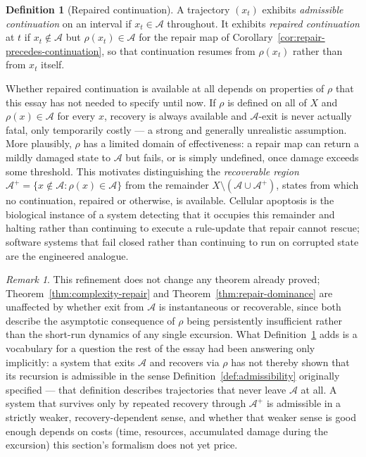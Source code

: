 \documentclass[11pt,a4paper]{article}
\theoremstyle{plain}
\theoremstyle{definition}
\newtheorem{definition}[theorem]{Definition}
\theoremstyle{remark}
\newtheorem{remark}[theorem]{Remark}
\newcommand{\Adm}{\mathcal{A}}
\begin{document}
\begin{definition}[Repaired continuation]
\label{def:repaired-continuation}
A trajectory $(x_t)$ exhibits \emph{admissible continuation} on an interval if $x_t \in \Adm$ throughout. It exhibits \emph{repaired continuation} at $t$ if $x_t \notin \Adm$ but $\rho(x_t) \in \Adm$ for the repair map of Corollary~\ref{cor:repair-precedes-continuation}, so that continuation resumes from $\rho(x_t)$ rather than from $x_t$ itself.
\end{definition}

Whether repaired continuation is available at all depends on properties of $\rho$ that this essay has not needed to specify until now. If $\rho$ is defined on all of $X$ and $\rho(x) \in \Adm$ for every $x$, recovery is always available and $\Adm$-exit is never actually fatal, only temporarily costly — a strong and generally unrealistic assumption. More plausibly, $\rho$ has a limited domain of effectiveness: a repair map can return a mildly damaged state to $\Adm$ but fails, or is simply undefined, once damage exceeds some threshold. This motivates distinguishing the \emph{recoverable region} $\Adm^{+} = \{x \notin \Adm : \rho(x) \in \Adm\}$ from the remainder $X \setminus (\Adm \cup \Adm^{+})$, states from which no continuation, repaired or otherwise, is available. Cellular apoptosis is the biological instance of a system detecting that it occupies this remainder and halting rather than continuing to execute a rule-update that repair cannot rescue; software systems that fail closed rather than continuing to run on corrupted state are the engineered analogue.

\begin{remark}
This refinement does not change any theorem already proved; Theorem~\ref{thm:complexity-repair} and Theorem~\ref{thm:repair-dominance} are unaffected by whether exit from $\Adm$ is instantaneous or recoverable, since both describe the asymptotic consequence of $\rho$ being persistently insufficient rather than the short-run dynamics of any single excursion. What Definition~\ref{def:repaired-continuation} adds is a vocabulary for a question the rest of the essay had been answering only implicitly: a system that exits $\Adm$ and recovers via $\rho$ has not thereby shown that its recursion is admissible in the sense Definition~\ref{def:admissibility} originally specified — that definition describes trajectories that never leave $\Adm$ at all. A system that survives only by repeated recovery through $\Adm^{+}$ is admissible in a strictly weaker, recovery-dependent sense, and whether that weaker sense is good enough depends on costs (time, resources, accumulated damage during the excursion) this section's formalism does not yet price.
\end{remark}
\end{document}
